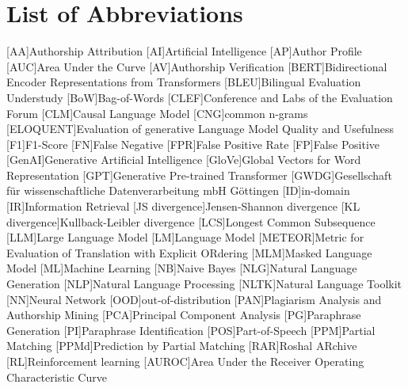 \chapter*{List of Abbreviations}

\begin{acronym}[XXXXXXXXX]
    [AA]{Authorship Attribution}
    [AI]{Artificial Intelligence}
    [AP]{Author Profile}
    [AUC]{Area Under the Curve}
    [AV]{Authorship Verification}
    [BERT]{Bidirectional Encoder Representations from Transformers}
    [BLEU]{Bilingual Evaluation Understudy}
    [BoW]{Bag-of-Words}
    [CLEF]{Conference and Labs of the Evaluation Forum}
    [CLM]{Causal Language Model}
    [CNG]{common n-grams}
    [ELOQUENT]{Evaluation of generative Language Model Quality and Usefulness}
    [F1]{F1-Score}
    [FN]{False Negative}
    [FPR]{False Positive Rate}
    [FP]{False Positive}
    [GenAI]{Generative Artificial Intelligence}
    [GloVe]{Global Vectors for Word Representation}
    [GPT]{Generative Pre-trained Transformer}
    [GWDG]{Gesellschaft für wissenschaftliche Datenverarbeitung mbH Göttingen}
    [ID]{in-domain}
    [IR]{Information Retrieval}
    [JS divergence]{Jensen-Shannon divergence}
    [KL divergence]{Kullback-Leibler divergence}
    [LCS]{Longest Common Subsequence}
    [LLM]{Large Language Model}
    [LM]{Language Model}
    [METEOR]{Metric for Evaluation of Translation with Explicit ORdering}
    [MLM]{Masked Language Model}
    [ML]{Machine Learning}
    [NB]{Naive Bayes}
    [NLG]{Natural Language Generation}
    [NLP]{Natural Language Processing}
    [NLTK]{Natural Language Toolkit}
    [NN]{Neural Network}
    [OOD]{out-of-distribution}
    [PAN]{Plagiarism Analysis and Authorship Mining} %
    [PCA]{Principal Component Analysis}
    [PG]{Paraphrase Generation}
    [PI]{Paraphrase Identification}
    [POS]{Part-of-Speech}
    [PPM]{Partial Matching}
    [PPMd]{Prediction by Partial Matching}
    [RAR]{Roshal ARchive}
    [RL]{Reinforcement learning}
    [AUROC]{Area Under the Receiver Operating Characteristic Curve}

\end{acronym}
